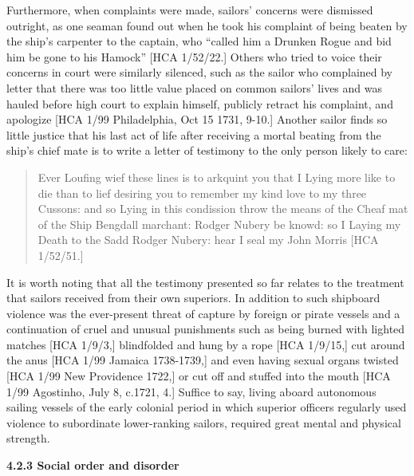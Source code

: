 \begin{styleStandard}
Furthermore, when complaints were made, sailors’ concerns were dismissed outright, as one seaman found out when he took his complaint of being beaten by the ship’s carpenter to the captain, who “called him a Drunken Rogue and bid him be gone to his Hamock” [HCA 1/52/22.] Others who tried to voice their concerns in court were similarly silenced, such as the sailor who complained by letter that there was too little value placed on common sailors’ lives and was hauled before high court to explain himself, publicly retract his complaint, and apologize [HCA 1/99 Philadelphia, Oct 15 1731, 9-10.] Another sailor finds so little justice that his last act of life after receiving a mortal beating from the ship’s chief mate is to write a letter of testimony to the only person likely to care:
\end{styleStandard}


\begin{quotation}
Ever Loufing wief these lines is to arkquint you that I Lying more like to die than to lief desiring you to remember my kind love to my three Cussons: and so Lying in this condission throw the means of the Cheaf mat of the Ship Bengdall marchant: Rodger Nubery be knowd: so I Laying my Death to the Sadd Rodger Nubery: hear I seal my John Morris [HCA 1/52/51.] 

\end{quotation}
\begin{styleStandard}
It is worth noting that all the testimony presented so far relates to the treatment that sailors received from their own superiors. In addition to such shipboard violence was the ever-present threat of capture by foreign or pirate vessels and a continuation of cruel and unusual punishments such as being burned with lighted matches [HCA 1/9/3,] blindfolded and hung by a rope [HCA 1/9/15,] cut around the anus [HCA 1/99 Jamaica 1738-1739,] and even having sexual organs twisted [HCA 1/99 New Providence 1722,] or cut off and stuffed into the mouth [HCA 1/99 Agostinho, July 8, c.1721, 4.] Suffice to say, living aboard autonomous sailing vessels of the early colonial period in which superior officers regularly used violence to subordinate lower-ranking sailors, required great mental and physical strength.
\end{styleStandard}


\begin{styleStandard}
\textbf{4.2.3 Social order and disorder}
\end{styleStandard}


